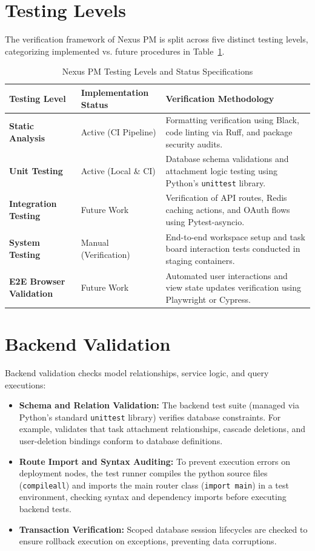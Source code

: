 \section{Testing Levels}
The verification framework of Nexus PM is split across five distinct testing levels, categorizing implemented vs. future procedures in Table~\ref{tab:testing_levels}.

\begin{table}[h!]
\centering
\small
\renewcommand{\arraystretch}{1.4}
\begin{tabularx}{\textwidth}{l l X}
    \toprule[1.5pt]
    \rowcolor{primary!5}
    \textbf{\color{primary}Testing Level} & \textbf{\color{primary}Implementation Status} & \textbf{\color{primary}Verification Methodology} \\
    \midrule
    \textbf{Static Analysis} & Active (CI Pipeline) & Formatting verification using Black, code linting via Ruff, and package security audits. \\
    \textbf{Unit Testing} & Active (Local \& CI) & Database schema validations and attachment logic testing using Python's \texttt{unittest} library. \\
    \textbf{Integration Testing} & Future Work & Verification of API routes, Redis caching actions, and OAuth flows using Pytest-asyncio. \\
    \textbf{System Testing} & Manual (Verification) & End-to-end workspace setup and task board interaction tests conducted in staging containers. \\
    \textbf{E2E Browser Validation} & Future Work & Automated user interactions and view state updates verification using Playwright or Cypress. \\
    \bottomrule[1.5pt]
\end{tabularx}
\caption{Nexus PM Testing Levels and Status Specifications}
\label{tab:testing_levels}
\end{table}

\section{Backend Validation}
Backend validation checks model relationships, service logic, and query executions:
\begin{itemize}
    \item \textbf{Schema and Relation Validation:} The backend test suite (managed via Python's standard \texttt{unittest} library) verifies database constraints. For example,  validates that task attachment relationships, cascade deletions, and user-deletion bindings conform to database definitions.
    \item \textbf{Route Import and Syntax Auditing:} To prevent execution errors on deployment nodes, the test runner compiles the python source files (\texttt{compileall}) and imports the main router class (\texttt{import main}) in a test environment, checking syntax and dependency imports before executing backend tests.
    \item \textbf{Transaction Verification:} Scoped database session lifecycles are checked to ensure rollback execution on exceptions, preventing data corruptions.
\end{itemize}

